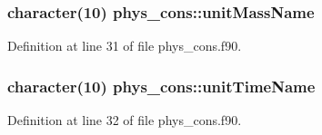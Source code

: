 \hypertarget{namespacephys__cons_a424a8036980301898dba6635e916fbf3}{
\subsubsection[{unitMassName}]{\setlength{\rightskip}{0pt plus 5cm}character(10) {\bf phys\_\-cons::unitMassName}}}
\label{namespacephys__cons_a424a8036980301898dba6635e916fbf3}


Definition at line 31 of file phys\_\-cons.f90.

\hypertarget{namespacephys__cons_ab67dd4bef4aa3213b5b9b35ff02d01d9}{
\subsubsection[{unitTimeName}]{\setlength{\rightskip}{0pt plus 5cm}character(10) {\bf phys\_\-cons::unitTimeName}}}
\label{namespacephys__cons_ab67dd4bef4aa3213b5b9b35ff02d01d9}


Definition at line 32 of file phys\_\-cons.f90.

